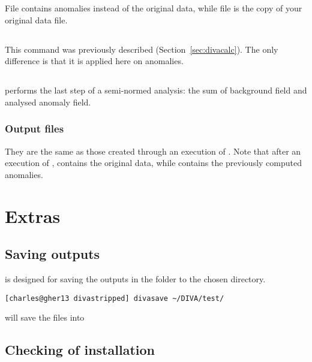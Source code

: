 File  contains anomalies instead of the original data, while file  is the copy of your original data file.


\subsection{}

This command was previously described (Section~\ref{sec:divacalc}). The only difference is that it is applied here on anomalies.


\subsection{}

 performs the last step of a semi-normed analysis: the sum of background field and analysed anomaly field. 

\subsubsection{Output files}

They are the same as those created through an execution of . Note that after an execution of ,  contains the original data, while  contains the previously computed anomalies. 



\section{Extras}

\subsection{Saving outputs}

 is designed for saving the outputs in the folder  to the chosen directory.

\example
\begin{lstlisting}[style=Bash]
[charles@gher13 divastripped] divasave ~/DIVA/test/
\end{lstlisting}
will save the files into 

\subsection{Checking of installation}

